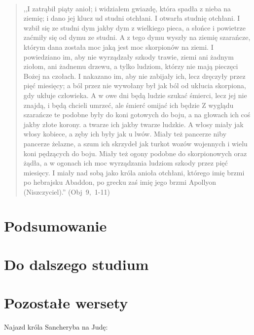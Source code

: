 \documentclass[10pt,a4paper,oneside]{article}
\begin{document}
\paragraph{}
\begin{quote}
,,I zatrąbił piąty anioł; i widziałem gwiazdę, która spadła z nieba na ziemię; i dano jej klucz ud studni otchłani. I otwarła studnię otchłani. I wzbił się ze studni dym jakby dym z wielkiego pieca, a słońce i powietrze zaćmiły się od dymu ze studni. A z tego dymu wyszły na ziemię szarańcze, którym dana została moc jaką jest moc skorpionów na ziemi. I powiedziano im, aby nie wyrządzały szkody trawie, ziemi ani żadnym ziołom, ani żadnemu drzewu, a tylko ludziom, którzy nie mają pieczęci Bożej na czołach. I nakazano im, aby nie zabijały ich, lecz dręczyły przez pięć miesięcy; a ból przez nie wywołany był jak ból od ukłucia skorpiona, gdy ukłuje człowieka. A w owe dni będą ludzie szukać śmierci, lecz jej nie znajdą, i będą chcieli umrzeć, ale śmierć omijać ich będzie Z wyglądu szarańcze te podobne były do koni gotowych do boju, a na głowach ich coś jakby złote korony. a twarze ich jakby twarze ludzkie. A włosy miały jak włosy kobiece, a zęby ich były jak u lwów. Miały też pancerze niby pancerze żelazne, a szum ich skrzydeł jak turkot wozów wojennych i wielu koni pędzących do boju. Miały też ogony podobne do skorpionowych oraz żądła, a w ogonach ich moc wyrządzania ludziom szkody przez pięć miesięcy. I miały nad sobą jako króla anioła otchłani, którego imię brzmi po hebrajsku Abaddon, po grecku zaś imię jego brzmi Apollyon (Niszczyciel).'' \mbox{(Obj 9, 1-11)}
\end{quote}
\section{Podsumowanie}
\section{Do dalszego studium}
\section{Pozostałe wersety}
\paragraph{}
Najazd króla Sancheryba na Judę:
\end{document}
